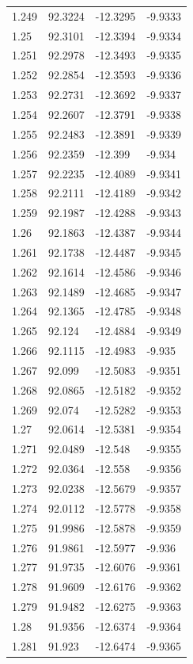 \begin{tabular}{llll}
1.249 & 92.3224 & -12.3295 & -9.9333 \\
1.25 & 92.3101 & -12.3394 & -9.9334 \\
1.251 & 92.2978 & -12.3493 & -9.9335 \\
1.252 & 92.2854 & -12.3593 & -9.9336 \\
1.253 & 92.2731 & -12.3692 & -9.9337 \\
1.254 & 92.2607 & -12.3791 & -9.9338 \\
1.255 & 92.2483 & -12.3891 & -9.9339 \\
1.256 & 92.2359 & -12.399 & -9.934 \\
1.257 & 92.2235 & -12.4089 & -9.9341 \\
1.258 & 92.2111 & -12.4189 & -9.9342 \\
1.259 & 92.1987 & -12.4288 & -9.9343 \\
1.26 & 92.1863 & -12.4387 & -9.9344 \\
1.261 & 92.1738 & -12.4487 & -9.9345 \\
1.262 & 92.1614 & -12.4586 & -9.9346 \\
1.263 & 92.1489 & -12.4685 & -9.9347 \\
1.264 & 92.1365 & -12.4785 & -9.9348 \\
1.265 & 92.124 & -12.4884 & -9.9349 \\
1.266 & 92.1115 & -12.4983 & -9.935 \\
1.267 & 92.099 & -12.5083 & -9.9351 \\
1.268 & 92.0865 & -12.5182 & -9.9352 \\
1.269 & 92.074 & -12.5282 & -9.9353 \\
1.27 & 92.0614 & -12.5381 & -9.9354 \\
1.271 & 92.0489 & -12.548 & -9.9355 \\
1.272 & 92.0364 & -12.558 & -9.9356 \\
1.273 & 92.0238 & -12.5679 & -9.9357 \\
1.274 & 92.0112 & -12.5778 & -9.9358 \\
1.275 & 91.9986 & -12.5878 & -9.9359 \\
1.276 & 91.9861 & -12.5977 & -9.936 \\
1.277 & 91.9735 & -12.6076 & -9.9361 \\
1.278 & 91.9609 & -12.6176 & -9.9362 \\
1.279 & 91.9482 & -12.6275 & -9.9363 \\
1.28 & 91.9356 & -12.6374 & -9.9364 \\
1.281 & 91.923 & -12.6474 & -9.9365 \\

\end{tabular}
